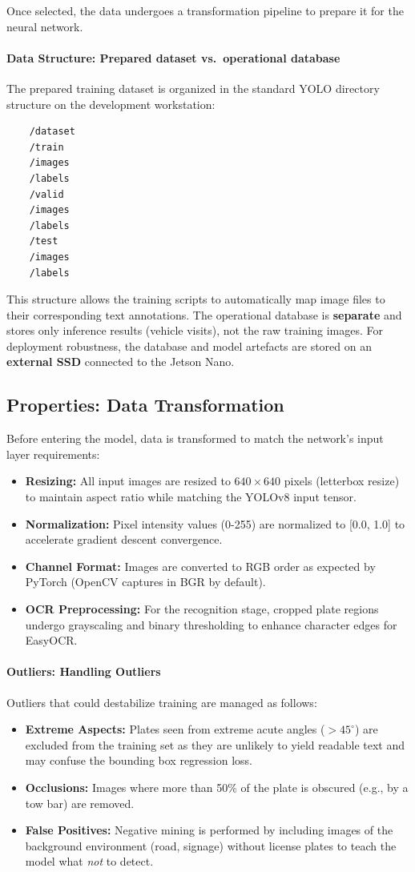 Once selected, the data undergoes a transformation pipeline to prepare it for the neural network.

\paragraph{Data Structure: Prepared dataset vs.\ operational database}
The prepared training dataset is organized in the standard YOLO directory structure on the development workstation:
\begin{verbatim}
	/dataset
	/train
	/images
	/labels
	/valid
	/images
	/labels
	/test
	/images
	/labels
\end{verbatim}
This structure allows the training scripts to automatically map image files to their corresponding text annotations. The operational database is \textbf{separate} and stores only inference results (vehicle visits), not the raw training images. For deployment robustness, the database and model artefacts are stored on an \textbf{external SSD} connected to the Jetson Nano.

\subsection{Properties: Data Transformation}
Before entering the model, data is transformed to match the network's input layer requirements:
\begin{itemize}
	\item \textbf{Resizing:} All input images are resized to $640 \times 640$ pixels (letterbox resize) to maintain aspect ratio while matching the YOLOv8 input tensor.
	\item \textbf{Normalization:} Pixel intensity values (0-255) are normalized to [0.0, 1.0] to accelerate gradient descent convergence.
	\item \textbf{Channel Format:} Images are converted to RGB order as expected by PyTorch (OpenCV captures in BGR by default).
	\item \textbf{OCR Preprocessing:} For the recognition stage, cropped plate regions undergo grayscaling and binary thresholding to enhance character edges for EasyOCR.
\end{itemize}

\paragraph{Outliers: Handling Outliers}
Outliers that could destabilize training are managed as follows:
\begin{itemize}
	\item \textbf{Extreme Aspects:} Plates seen from extreme acute angles ($>45^\circ$) are excluded from the training set as they are unlikely to yield readable text and may confuse the bounding box regression loss.
	\item \textbf{Occlusions:} Images where more than 50\% of the plate is obscured (e.g., by a tow bar) are removed.
	\item \textbf{False Positives:} Negative mining is performed by including images of the background environment (road, signage) without license plates to teach the model what \textit{not} to detect.
\end{itemize}

